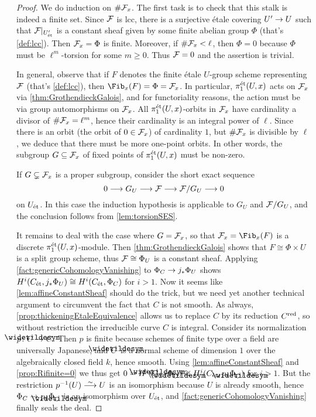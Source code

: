 \begin{proof}
	We do induction on $\# \mathcal{F}_x$. The first task is to check that this stalk is indeed a finite set. Since $\mathcal{F}$ is lcc, there is a surjective étale covering $U'\morphism U$ such that $\mathcal{F}|_{U'_{\mathrm{\acute{e}t}}}$ is a constant sheaf given by some finite abelian group $\Phi$ (that's \cref{def:lcc}). Then $\mathcal{F}_x=\Phi$ is finite. Moreover, if $\#\mathcal{F}_x<\ell$, then $\Phi=0$ because $\Phi$ must be $\ell^m$-torsion for some $m\geq 0$. Thus $\mathcal{F}=0$ and the assertion is trivial.
	
	In general, observe that if $F$ denotes the finite étale $U$-group scheme representing $\mathcal{F}$ (that's \cref{def:lcc}), then $\Fib_x(F)=\Phi= \Ff_x$. In particular, $\pi_1^{\mathrm{\acute{e}t}}(U,x)$ acts on $\mathcal{F}_x$ via \cref{thm:GrothendieckGalois}, and for functoriality reasons, the action must be via group automorphisms on $\mathcal{F}_x$. All $\pi_1^{\mathrm{\acute{e}t}}(U,x)$-orbits in $\mathcal{F}_x$ have cardinality a divisor of $\#\mathcal{F}_x=\ell^m$, hence their cardinality is an integral power of $\ell$. Since there is an orbit (the orbit of $0\in \mathcal{F}_x$) of cardinality $1$, but $\#\mathcal{F}_x$ is divisible by $\ell$, we deduce that there must be more one-point orbits. In other words, the subgroup $G\subseteq \mathcal{F}_x$ of fixed points of $\pi_1^{\mathrm{\acute{e}t}}(U,x)$ must be non-zero.
	
	If $G\subsetneq \mathcal{F}_x$ is a proper subgroup, consider the short exact sequence
	\begin{equation*}
	0\morphism G_U\morphism \Ff\morphism \Ff/G_U\morphism 0
	\end{equation*}
	on $U_{\mathrm{\acute{e}t}}$. In this case the induction hypothesis is applicable to $G_U$ and $\mathcal{F}/G_U$, and the conclusion follows from \cref{lem:torsionSES}.
	
	It remains to deal with the case where $G=\mathcal{F}_x$, so that $\Ff_x=\Fib_x(F)$ is a discrete $\pi_1^{\mathrm{\acute{e}t}}(U,x)$-module. Then \cref{thm:GrothendieckGalois} shows that $F\cong \Phi\times U$ is a split group scheme, thus $\mathcal{F}\cong \Phi_U$ is a constant sheaf. Applying \cref{fact:genericCohomologyVanishing} to $\Phi_C\morphism j_*\Phi_U$ shows $H^i(C_{\mathrm{\acute{e}t}},j_*\Phi_U)\cong H^i(C_{\mathrm{\acute{e}t}},\Phi_C)$ for $i>1$. Now it seems like \cref{lem:affineConstantSheaf} should do the trick, but we need yet another technical argument to circumvent the fact that $C$ is not smooth. As always, \cref{prop:thickeningEtaleEquivalence} allows us to replace $C$ by its reduction $C^{\mathrm{red}}$, so without restriction the irreducible curve $C$ is integral. Consider its normalization $p\colon \snake{C}\morphism C$. Then $p$ is finite because schemes of finite type over a field are universally Japanese, and $\snake{C}$ is a normal scheme of dimension $1$ over the algebraically closed field $k$, hence smooth. Using \cref{lem:affineConstantSheaf} and \cref{prop:Rifinite=0} we thus get $0=H^i(\snake{C}_\et,\Phi_{\snake{C}})\cong H^i(C_\et,p_*\Phi_{\snake{C}})$ for $i>1$. But the restriction $p^{-1}(U)\isomorphism U$ is an isomorphism because $U$ is already smooth, hence $\Phi_C\morphism p_*\Phi_{\snake{C}}$ is an isomorphism over $U_{\mathrm{\acute{e}t}}$, and \cref{fact:genericCohomologyVanishing} finally seals the deal. 
\end{proof}
